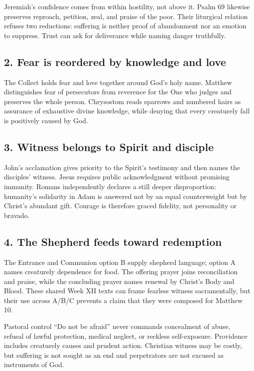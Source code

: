 \begin{deepstudy}
Jeremiah's confidence comes from within hostility, not above it. Psalm 69 likewise preserves reproach, petition, zeal, and praise of the poor. Their liturgical relation refuses two reductions: suffering is neither proof of abandonment nor an emotion to suppress. Trust can ask for deliverance while naming danger truthfully.

\subsection*{2. Fear is reordered by knowledge and love\enspace{}}

The Collect holds fear and love together around God's holy name. Matthew distinguishes fear of persecutors from reverence for the One who judges and preserves the whole person. Chrysostom reads sparrows and numbered hairs as assurance of exhaustive divine knowledge, while denying that every creaturely fall is positively caused by God.

\subsection*{3. Witness belongs to Spirit and disciple\enspace{}}

John's acclamation gives priority to the Spirit's testimony and then names the disciples' witness. Jesus requires public acknowledgment without promising immunity. Romans independently declares a still deeper disproportion: humanity's solidarity in Adam is answered not by an equal counterweight but by Christ's abundant gift. Courage is therefore graced fidelity, not personality or bravado.

\subsection*{4. The Shepherd feeds toward redemption\enspace{}}

The Entrance and Communion option B supply shepherd language; option A names creaturely dependence for food. The offering prayer joins reconciliation and praise, while the concluding prayer names renewal by Christ's Body and Blood. These shared Week XII texts can frame fearless witness sacramentally, but their use across A/B/C prevents a claim that they were composed for Matthew 10.

\begin{studybox}{Pastoral control}
“Do not be afraid” never commands concealment of abuse, refusal of lawful protection, medical neglect, or reckless self-exposure. Providence includes creaturely causes and prudent action. Christian witness may be costly, but suffering is not sought as an end and perpetrators are not excused as instruments of God.
\end{studybox}


\end{deepstudy}

